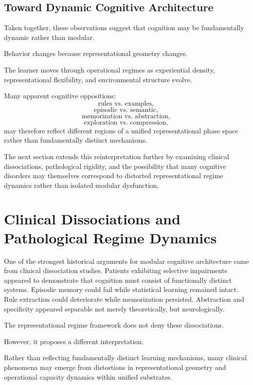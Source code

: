 \documentclass[12pt,a4paper]{article}
\begin{document}
\subsection{Toward Dynamic Cognitive Architecture}

Taken together, these observations suggest that cognition may be fundamentally dynamic rather than modular.

Behavior changes because representational geometry changes.

The learner moves through operational regimes as experiential density, representational flexibility, and environmental structure evolve.

Many apparent cognitive oppositions:
\[
\text{rules vs.\ examples},
\]
\[
\text{episodic vs.\ semantic},
\]
\[
\text{memorization vs.\ abstraction},
\]
\[
\text{exploration vs.\ compression},
\]
may therefore reflect different regions of a unified representational phase space rather than fundamentally distinct mechanisms.

The next section extends this reinterpretation further by examining clinical dissociations, pathological rigidity, and the possibility that many cognitive disorders may themselves correspond to distorted representational regime dynamics rather than isolated modular dysfunction.

\section{Clinical Dissociations and Pathological Regime Dynamics}

One of the strongest historical arguments for modular cognitive architecture came from clinical dissociation studies. Patients exhibiting selective impairments appeared to demonstrate that cognition must consist of functionally distinct systems. Episodic memory could fail while statistical learning remained intact. Rule extraction could deteriorate while memorization persisted. Abstraction and specificity appeared separable not merely theoretically, but neurologically.

The representational regime framework does not deny these dissociations.

However, it proposes a different interpretation.

Rather than reflecting fundamentally distinct learning mechanisms, many clinical phenomena may emerge from distortions in representational geometry and operational capacity dynamics within unified substrates.
\end{document}
